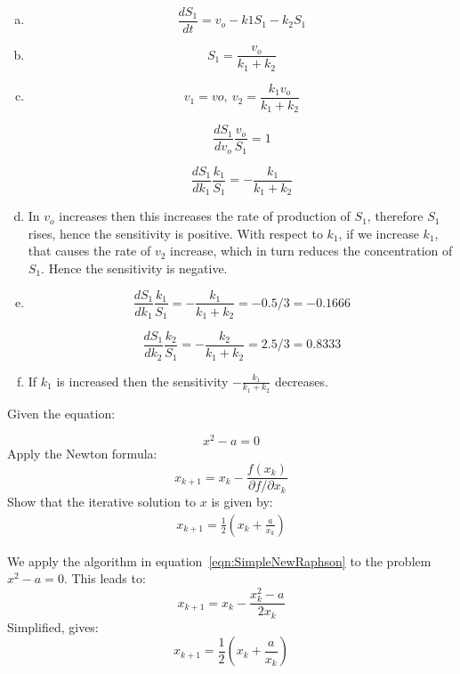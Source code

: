 \documentclass[12pt]{article}
\begin{document}
\begin{solution}
\begin{enumerate}[a)]
\item $$ \frac{dS_1}{dt} = v_o - k1 S_1 - k_2 S_1 $$
\item $$ S_1 = \frac{v_o}{k_1 + k_2} $$
\item $$ v_1 = vo, \ v_2 = \frac{k_1 v_o}{k_1 + k_2} $$

$$ \frac{dS_1}{dv_o} \frac{v_o}{S_1} = 1 $$

$$ \frac{dS_1}{dk_1} \frac{k_1}{S_1} = -\frac{k_1}{k_1 + k_2} $$

\item
In $v_o$ increases then this increases the rate of production of $S_1$, therefore $S_1$ rises, hence the sensitivity is positive. With respect to $k_1$, if we increase $k_1$, that causes the rate of $v_2$ increase, which in turn reduces the concentration of $S_1$. Hence the sensitivity is negative.

\item

$$ \frac{dS_1}{dk_1} \frac{k_1}{S_1} = -\frac{k_1}{k_1 + k_2} = -0.5/3 = -0.1666 $$

$$ \frac{dS_1}{dk_2} \frac{k_2}{S_1} = -\frac{k_2}{k_1 + k_2} = 2.5/3 = 0.8333 $$

\item
If $k_1$ is increased then the sensitivity $-\frac{k_1}{k_1 + k_2}$ decreases.
\end{enumerate}
\end{solution}



\begin{question}
Given the equation:

$$ x^2 - a = 0 $$
%
Apply the Newton formula:
%
$$ x_{k+1} = x_k - \frac{f(x_k)}{\partial f/\partial x_k} $$
%
Show that the iterative solution to $x$ is given by:
%
\begin{align}
 x_{k+1} = \frac{1}{2} \left( x_k + \frac{a}{x_k} \right)
 \label{eqn:NRSquareRoot}
\end{align}

\end{question}
\begin{solution}
We apply the algorithm in equation~\eqref{eqn:SimpleNewRaphson} to the problem $x^2 - a = 0$. This leads to:
%
$$ x_{k+1} = x_k - \frac{x^2_k - a}{2 x_k} $$
Simplified, gives:
$$ x_{k+1} = \frac{1}{2} \left( x_k + \frac{a}{x_k} \right) $$
\end{solution}
\end{document}
